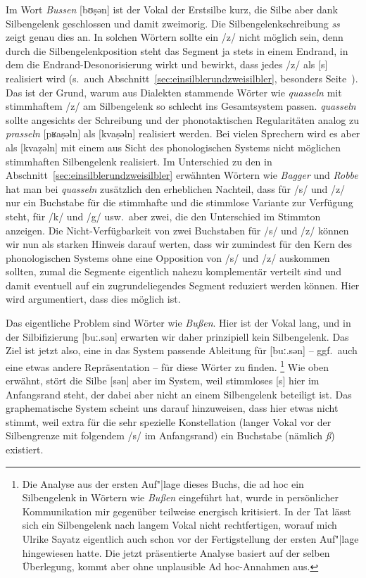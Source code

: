 Im Wort \textit{Bussen} [bʊṣən] ist der Vokal der Erstsilbe kurz, die Silbe aber dank Silbengelenk geschlossen und damit zweimorig.
Die Silbengelenkschreibung \textit{ss} zeigt genau dies an.
In solchen Wörtern sollte ein /z/ nicht möglich sein, denn durch die Silbengelenkposition steht das Segment ja stets in einem Endrand, in dem die Endrand-Desonorisierung wirkt und bewirkt, dass jedes /z/ als [s] realisiert wird (s.\ auch Abschnitt~\ref{sec:einsilblerundzweisilbler}, besonders Seite~\pageref{abs:einsilblerundzweisilbler149}).
Das ist der Grund, warum aus Dialekten stammende Wörter wie \textit{quasseln} mit stimmhaftem /z/ am Silbengelenk so schlecht ins Gesamtsystem passen.
\textit{quasseln} sollte angesichts der Schreibung und der phonotaktischen Regularitäten analog zu \textit{prasseln} [pʁaṣəln] als [kvaṣəln] realisiert werden.
Bei vielen Sprechern wird es aber als [kvaẓəln] mit einem aus Sicht des phonologischen Systems nicht möglichen stimmhaften Silbengelenk realisiert.
Im Unterschied zu den in Abschnitt~\ref{sec:einsilblerundzweisilbler} erwähnten Wörtern wie \textit{Bagger} und \textit{Robbe} hat man bei \textit{quasseln} zusätzlich den erheblichen Nachteil, dass für /s/ und /z/ nur ein Buchstabe für die stimmhafte und die stimmlose Variante zur Verfügung steht, für /k/ und /g/ usw.\ aber zwei, die den Unterschied im Stimmton anzeigen.
Die Nicht-Verfügbarkeit von zwei Buchstaben für /s/ und /z/ können wir nun als starken Hinweis darauf werten, dass wir zumindest für den Kern des phonologischen Systems ohne eine Opposition von /s/ und /z/ auskommen sollten, zumal die Segmente eigentlich nahezu komplementär verteilt sind und damit eventuell auf ein zugrundeliegendes Segment reduziert werden können.
Hier wird argumentiert, dass dies möglich ist.

Das eigentliche Problem sind Wörter wie \textit{Bußen}.
Hier ist der Vokal lang, und in der Silbifizierung [buː.sən] erwarten wir daher prinzipiell kein Silbengelenk.
Das Ziel ist jetzt also, eine in das System passende Ableitung für [buː.sən] -- ggf.\ auch eine etwas andere Repräsentation -- für diese Wörter zu finden.%
\footnote{Die Analyse aus der ersten Auf"|lage dieses Buchs, die ad hoc ein Silbengelenk in Wörtern wie \textit{Bußen} eingeführt hat, wurde in persönlicher Kommunikation mir gegenüber teilweise energisch kritisiert.
In der Tat lässt sich ein Silbengelenk nach langem Vokal nicht rechtfertigen, worauf mich Ulrike Sayatz eigentlich auch schon vor der Fertigstellung der ersten Auf"|lage hingewiesen hatte.
Die jetzt präsentierte Analyse basiert auf der selben Überlegung, kommt aber ohne unplausible Ad hoc-Annahmen aus.}
Wie oben erwähnt, stört die Silbe [sən] aber im System, weil stimmloses [s] hier im Anfangsrand steht, der dabei aber nicht an einem Silbengelenk beteiligt ist.
Das graphematische System scheint uns darauf hinzuweisen, dass hier etwas nicht stimmt, weil extra für die sehr spezielle Konstellation (langer Vokal vor der Silbengrenze mit folgendem /s/ im Anfangsrand) ein Buchstabe (nämlich \textit{ß}) existiert.

